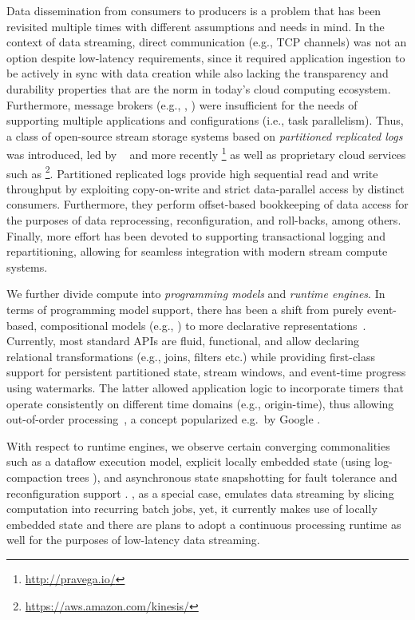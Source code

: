  Data dissemination from consumers to producers is a problem that has been revisited multiple times with different assumptions and needs in mind. In the context of data streaming, direct communication (e.g., TCP channels) was not an option despite low-latency requirements, since it required application ingestion to be actively in sync with data creation while also lacking the transparency and durability properties that are the norm in today's cloud computing ecosystem. Furthermore, message brokers (e.g., , ) were insufficient for the needs of supporting multiple applications and configurations (i.e., task parallelism). Thus, a class of open-source stream storage systems based on \emph{partitioned replicated logs} was introduced, led by ~\cite{kreps2011kafka} and more recently \footnote{\url{http://pravega.io/}} as well as proprietary cloud services such as \footnote{\url{https://aws.amazon.com/kinesis/}}. Partitioned replicated logs provide high sequential read and write throughput by exploiting copy-on-write and strict data-parallel access by distinct consumers. Furthermore, they perform offset-based bookkeeping of data access for the purposes of data reprocessing, reconfiguration, and roll-backs, among others. Finally, more effort has been devoted to supporting transactional logging and repartitioning, allowing for seamless integration with modern stream compute systems.

 We further divide compute into \emph{programming models} and \emph{runtime engines}. In terms of programming model support, there has been a shift from purely event-based, compositional models (e.g.,  \cite{toshniwal_et_al_2014}) to more declarative representations~\cite{carbone_et_al_2015,akidau2015dataflow,zaharia_et_al_2013}. Currently, most standard APIs are fluid, functional, and allow declaring relational transformations (e.g., joins, filters etc.) while providing first-class support for persistent partitioned state, stream windows, and event-time prog\-ress using watermarks. The latter allowed application logic to incorporate timers that operate consistently on different time domains (e.g., origin-time), thus allowing out-of-order processing~\cite{li2008out},  a concept popularized e.g.\ by Google \cite{millwheel,akidau2015dataflow}.

With respect to runtime engines, we observe certain converging commonalities such as a dataflow execution model, explicit locally embedded state (using log-compaction trees \cite{CUSTOM:web/rocksdb}), and asynchronous state snapshotting for fault tolerance and reconfiguration support \cite{state2017carbone,jacques2016consistent}.  \cite{zaharia_et_al_2013}, as a special case, emulates data streaming by slicing computation into recurring batch jobs, yet, it currently makes use of locally embedded state and there are plans to adopt a continuous processing runtime as well for the purposes of low-latency data streaming.

